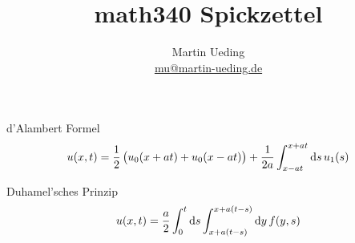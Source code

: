 


\title{math340 Spickzettel}
\author{
	Martin Ueding \\
	\small{\href{mailto:mu@martin-ueding.de}{mu@martin-ueding.de}}
}



\maketitle

d'Alambert Formel
\[
	u(x, t) = \half \del{
		u_0(x + at)
		+ u_0(x - at)
	}
	+ \frac{1}{2a} \int_{x-at}^{x+at} \dif s \, u_1(s)
\]

Duhamel'sches Prinzip
\[
	u(x, t) = \frac a2
	\int_0^t \dif s
	\int_{x+a(t-s)}^{x+a(t-s)} \dif y \, f(y, s)
\]

%	
%	



